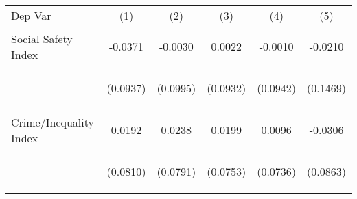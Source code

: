 \begin{center}
\begin{tabular}{lccccc}
\hline \noalign{\smallskip}Dep Var & (1) & (2) & (3) & (4) & (5)\\
\noalign{\smallskip}\hline \noalign{\smallskip}Social Safety Index & \begin{scriptsize}-0.0371\end{scriptsize} & \begin{scriptsize}-0.0030\end{scriptsize} & \begin{scriptsize}0.0022\end{scriptsize} & \begin{scriptsize}-0.0010\end{scriptsize} & \begin{scriptsize}-0.0210\end{scriptsize}\\
 & \begin{scriptsize}(0.0937)\end{scriptsize} & \begin{scriptsize}(0.0995)\end{scriptsize} & \begin{scriptsize}(0.0932)\end{scriptsize} & \begin{scriptsize}(0.0942)\end{scriptsize} & \begin{scriptsize}(0.1469)\end{scriptsize}\\
\noalign{\smallskip}Crime/Inequality Index & \begin{scriptsize}0.0192\end{scriptsize} & \begin{scriptsize}0.0238\end{scriptsize} & \begin{scriptsize}0.0199\end{scriptsize} & \begin{scriptsize}0.0096\end{scriptsize} & \begin{scriptsize}-0.0306\end{scriptsize}\\
 & \begin{scriptsize}(0.0810)\end{scriptsize} & \begin{scriptsize}(0.0791)\end{scriptsize} & \begin{scriptsize}(0.0753)\end{scriptsize} & \begin{scriptsize}(0.0736)\end{scriptsize} & \begin{scriptsize}(0.0863)\end{scriptsize}\\

\end{tabular}
\end{center}
